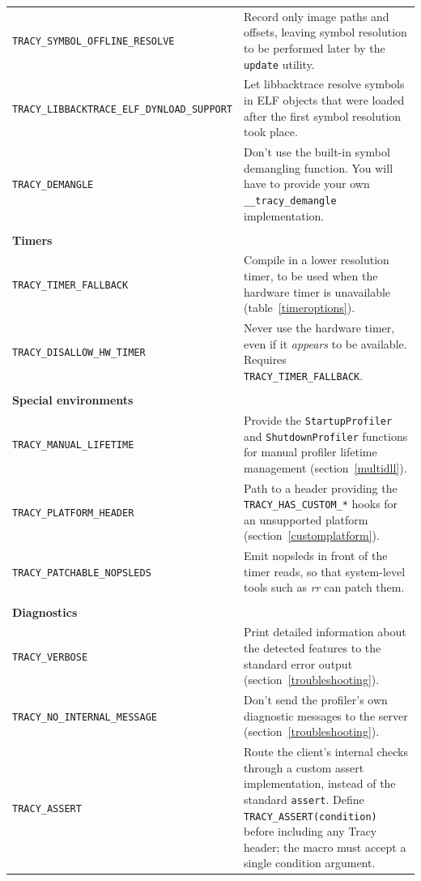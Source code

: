 \documentclass[hidelinks,titlepage,a4paper,twoside]{article}
\begin{document}
\begin{footnotesize}
\begin{longtable}{@{}p{}p{}@{}}
\texttt{TRACY\_SYMBOL\_OFFLINE\_RESOLVE} & Record only image paths and offsets, leaving symbol resolution to be performed later by the \texttt{update} utility. \\
\texttt{TRACY\_LIBBACKTRACE\_ELF\_DYNLOAD\_SUPPORT} & Let libbacktrace resolve symbols in ELF objects that were loaded after the first symbol resolution took place. \\
\texttt{TRACY\_DEMANGLE} & Don't use the built-in symbol demangling function. You will have to provide your own \texttt{\_\_tracy\_demangle} implementation. \\
& \\
\textbf{Timers} & \\
\texttt{TRACY\_TIMER\_FALLBACK} & Compile in a lower resolution timer, to be used when the hardware timer is unavailable (table~\ref{timeroptions}). \\
\texttt{TRACY\_DISALLOW\_HW\_TIMER} & Never use the hardware timer, even if it \emph{appears} to be available. Requires \texttt{TRACY\_TIMER\_FALLBACK}. \\
& \\
\textbf{Special environments} & \\
\texttt{TRACY\_MANUAL\_LIFETIME} & Provide the \texttt{StartupProfiler} and \texttt{ShutdownProfiler} functions for manual profiler lifetime management (section~\ref{multidll}). \\
\texttt{TRACY\_PLATFORM\_HEADER} & Path to a header providing the \texttt{TRACY\_HAS\_CUSTOM\_*} hooks for an unsupported platform (section~\ref{customplatform}). \\
\texttt{TRACY\_PATCHABLE\_NOPSLEDS} & Emit nopsleds in front of the timer reads, so that system-level tools such as \emph{rr} can patch them. \\
& \\
\textbf{Diagnostics} & \\
\texttt{TRACY\_VERBOSE} & Print detailed information about the detected features to the standard error output (section~\ref{troubleshooting}). \\
\texttt{TRACY\_NO\_INTERNAL\_MESSAGE} & Don't send the profiler's own diagnostic messages to the server (section~\ref{troubleshooting}). \\
\texttt{TRACY\_ASSERT} & Route the client's internal checks through a custom assert implementation, instead of the standard \texttt{assert}. Define \texttt{TRACY\_ASSERT(condition)} before including any Tracy header; the macro must accept a single condition argument. \\
\end{longtable}
\end{footnotesize}
\end{document}
